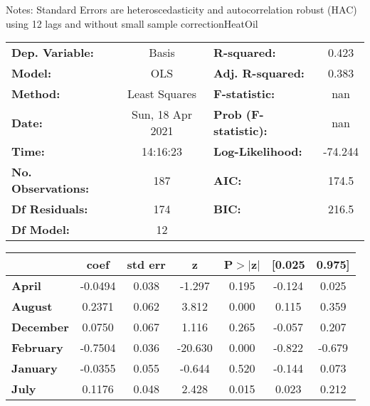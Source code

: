Notes: \newline
 [1] Standard Errors are heteroscedasticity and autocorrelation robust (HAC) using 12 lags and without small sample correctionHeatOil\begin{center}
\begin{tabular}{lclc}
\toprule
\textbf{Dep. Variable:}    &      Basis       & \textbf{  R-squared:         } &     0.423   \\
\textbf{Model:}            &       OLS        & \textbf{  Adj. R-squared:    } &     0.383   \\
\textbf{Method:}           &  Least Squares   & \textbf{  F-statistic:       } &       nan   \\
\textbf{Date:}             & Sun, 18 Apr 2021 & \textbf{  Prob (F-statistic):} &      nan    \\
\textbf{Time:}             &     14:16:23     & \textbf{  Log-Likelihood:    } &   -74.244   \\
\textbf{No. Observations:} &         187      & \textbf{  AIC:               } &     174.5   \\
\textbf{Df Residuals:}     &         174      & \textbf{  BIC:               } &     216.5   \\
\textbf{Df Model:}         &          12      & \textbf{                     } &             \\
\bottomrule
\end{tabular}
\begin{tabular}{lcccccc}
                   & \textbf{coef} & \textbf{std err} & \textbf{z} & \textbf{P$> |$z$|$} & \textbf{[0.025} & \textbf{0.975]}  \\
\midrule
\textbf{April}     &      -0.0494  &        0.038     &    -1.297  &         0.195        &       -0.124    &        0.025     \\
\textbf{August}    &       0.2371  &        0.062     &     3.812  &         0.000        &        0.115    &        0.359     \\
\textbf{December}  &       0.0750  &        0.067     &     1.116  &         0.265        &       -0.057    &        0.207     \\
\textbf{February}  &      -0.7504  &        0.036     &   -20.630  &         0.000        &       -0.822    &       -0.679     \\
\textbf{January}   &      -0.0355  &        0.055     &    -0.644  &         0.520        &       -0.144    &        0.073     \\
\textbf{July}      &       0.1176  &        0.048     &     2.428  &         0.015        &        0.023    &        0.212     \\

\end{tabular}
\end{center}
